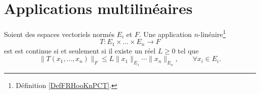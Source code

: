 
\section{Applications multilinéaires}


\begin{proposition} \label{PropUADlSMg}
	Soient des espaces vectoriels normés \( E_i\) et \( F\). Une application \( n\)-linéaire\footnote{Définition \ref{DefFRHooKnPCT}.}
	\begin{equation}
		T\colon E_1\times\ldots\times E_n\to F
	\end{equation}
	est est continue si et seulement si il existe un réel \( L\geq 0\) tel que
	\begin{equation}\label{limitatezza}
		\|T(x_1, \ldots,x_n)\|_F\leq L \|x_1\|_{E_1}\cdots\|x_n\|_{E_n}, \qquad \forall x_i\in E_i.
	\end{equation}
\end{proposition}


